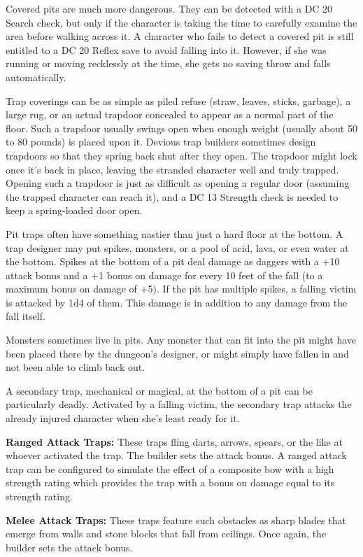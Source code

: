 Covered pits are much more dangerous. They can be detected with a DC 20 Search 
check, but only if the character is taking the time to carefully examine the area 
before walking across it. A character who fails to detect a covered pit is still 
entitled to a DC 20 Reflex save to avoid falling into it. However, if she was running 
or moving recklessly at the time, she gets no saving throw and falls automatically.

Trap coverings can be as simple as piled refuse (straw, leaves, sticks, garbage), 
a large rug, or an actual trapdoor concealed to appear as a normal part of the 
floor. Such a trapdoor usually swings open when enough weight (usually about 50 
to 80 pounds) is placed upon it. Devious trap builders sometimes design trapdoors 
so that they spring back shut after they open. The trapdoor might lock once it's 
back in place, leaving the stranded character well and truly trapped. Opening such 
a trapdoor is just as difficult as opening a regular door (assuming the trapped 
character can reach it), and a DC 13 Strength check is needed to keep a spring-loaded 
door open.

Pit traps often have something nastier than just a hard floor at the bottom. A 
trap designer may put spikes, monsters, or a pool of acid, lava, or even water 
at the bottom. Spikes at the bottom of a pit deal damage as daggers with a +10 
attack bonus and a +1 bonus on damage for every 10 feet of the fall (to a maximum 
bonus on damage of +5). If the pit has multiple spikes, a falling victim is attacked 
by 1d4 of them. This damage is in addition to any damage from the fall itself. 

Monsters sometimes live in pits. Any monster that can fit into the pit might have 
been placed there by the dungeon's designer, or might simply have fallen in and 
not been able to climb back out. 

A secondary trap, mechanical or magical, at the bottom of a pit can be particularly 
deadly. Activated by a falling victim, the secondary trap attacks the already injured 
character when she's least ready for it.

\textbf{Ranged Attack Traps:} These traps fling darts, arrows, spears, or the like 
at whoever activated the trap. The builder sets the attack bonus. A ranged attack 
trap can be configured to simulate the effect of a composite bow with a high strength 
rating which provides the trap with a bonus on damage equal to its strength rating.

\textbf{Melee Attack Traps:} These traps feature such obstacles as sharp blades 
that emerge from walls and stone blocks that fall from ceilings. Once again, the 
builder sets the attack bonus.

